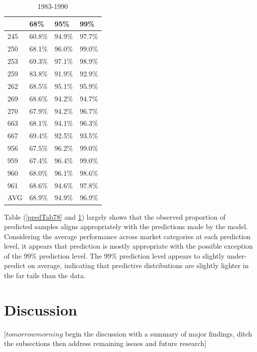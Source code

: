 \documentclass[12pt]{article}
\begin{document}
\begin{table}[h!]
\centering
\begin{tabular}[c]{@{}llll@{}}
\hline
& 68\% & 95\% & 99\% \\ \hline
245 & 60.8\% & 94.9\% & 97.7\% \\  
250 & 68.1\% & 96.0\% & 99.0\% \\
253 & 69.3\% & 97.1\% & 98.9\% \\
259 & 83.8\% & 91.9\% & 92.9\% \\
262 & 68.5\% & 95.1\% & 95.9\% \\
269 & 68.6\% & 94.2\% & 94.7\% \\
270 & 67.9\% & 94.2\% & 96.7\% \\
663 & 68.1\% & 94.1\% & 96.3\% \\
667 & 69.4\% & 92.5\% & 93.5\% \\
956 & 67.5\% & 96.2\% & 99.0\% \\
959 & 67.4\% & 96.4\% & 99.0\% \\
960 & 68.0\% & 96.1\% & 98.6\% \\
961 & 68.6\% & 94.6\% & 97.8\% \\
AVG & 68.9\% & 94.9\% & 96.9\% \\ \hline
\end{tabular}
\caption{1983-1990}
\label{predTab83}
\end{table}

Table (\ref{predTab78} and \ref{predTab83}) largely shows that the observed 
proportion of predicted samples aligns appropriately with the predictions made 
by the model. Considering the average performance across market categories 
at each prediction level, it appears that prediction is mostly appropriate 
with the possible exception of the 99\% prediction level. The 99\% prediction 
level appears to slightly under-predict on average, indicating that predictive 
distributions are slightly lighter in the far tails than the data.

%
%
\section{Discussion}\label{discussion}
%
%

[$tomorrow morning$ begin the discussion with a summary of major findings, 
ditch the subsections then address remaining issues and future research]
\end{document}
